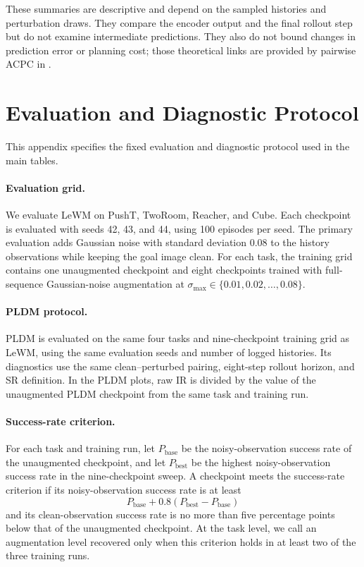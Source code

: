 \documentclass[10pt]{article}
\newcommand{\stdmax}{\ensuremath{\sigma_{\max}}}
\begin{document}
These summaries are descriptive and depend on the sampled histories and
perturbation draws. They compare the encoder output and the final rollout step
but do not examine intermediate predictions. They also do not bound changes
in prediction error or planning cost; those theoretical links are provided by
pairwise ACPC in .

\section{Evaluation and Diagnostic Protocol}\label{sec:appendix-A}

This appendix specifies the fixed evaluation and diagnostic protocol used in
the main tables.

\paragraph{Evaluation grid.}
We evaluate LeWM on PushT, TwoRoom, Reacher, and Cube. Each checkpoint is
evaluated with seeds 42, 43, and 44, using 100 episodes per seed. The primary
evaluation adds Gaussian noise with standard deviation $0.08$ to the history
observations while keeping the goal image clean. For each task, the training
grid contains one unaugmented checkpoint and eight checkpoints trained with
full-sequence Gaussian-noise augmentation at
$\stdmax{}\in\{0.01,0.02,\ldots,0.08\}$.

\paragraph{PLDM protocol.}
PLDM is evaluated on the same four tasks and nine-checkpoint training grid as
LeWM, using the same evaluation seeds and number of logged histories. Its
diagnostics use the same clean--perturbed pairing, eight-step rollout horizon,
and SR definition. In the PLDM plots, raw IR is divided by the value of the
unaugmented PLDM checkpoint from the same task and training run.

\paragraph{Success-rate criterion.}
For each task and training run, let $P_{\mathrm{base}}$ be the
noisy-observation success rate of the unaugmented checkpoint, and let
$P_{\mathrm{best}}$ be the highest noisy-observation success rate in the
nine-checkpoint sweep. A checkpoint meets the success-rate criterion if its
noisy-observation success rate is at least
\[
P_{\mathrm{base}}+0.8(P_{\mathrm{best}}-P_{\mathrm{base}})
\]
and its clean-observation success rate is no more than five percentage points
below that of the unaugmented checkpoint. At the task level, we call an
augmentation level recovered only when this criterion holds in at least two
of the three training runs.
\end{document}
